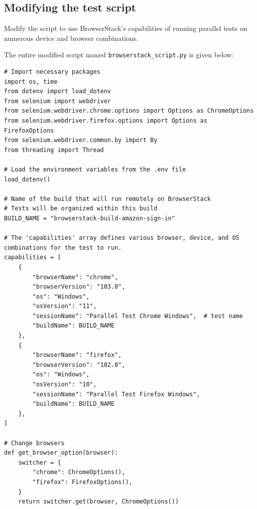 \documentclass{article}
\begin{document}
\subsection*{Modifying the test script}

Modify the script to use BrowserStack's capabilities of running parallel tests on numerous device and browser combinations.

The entire modified script named \texttt{browserstack\_script.py} is given below:

\begin{lstlisting}[style=python]
# Import necessary packages
import os, time
from dotenv import load_dotenv
from selenium import webdriver
from selenium.webdriver.chrome.options import Options as ChromeOptions
from selenium.webdriver.firefox.options import Options as FirefoxOptions
from selenium.webdriver.common.by import By
from threading import Thread

# Load the environment variables from the .env file
load_dotenv()

# Name of the build that will run remotely on BrowserStack
# Tests will be organized within this build
BUILD_NAME = "browserstack-build-amazon-sign-in"

# The 'capabilities' array defines various browser, device, and OS combinations for the test to run.
capabilities = [
    {
        "browserName": "chrome",
        "browserVersion": "103.0",
        "os": "Windows",
        "osVersion": "11",
        "sessionName": "Parallel Test Chrome Windows",  # test name
        "buildName": BUILD_NAME  
    },
    {
        "browserName": "firefox",
        "browserVersion": "102.0",
        "os": "Windows",
        "osVersion": "10",
        "sessionName": "Parallel Test Firefox Windows",
        "buildName": BUILD_NAME
    },
]

# Change browsers
def get_browser_option(browser):
    switcher = {
        "chrome": ChromeOptions(),
        "firefox": FirefoxOptions(),
    }
    return switcher.get(browser, ChromeOptions())


\end{lstlisting}
\end{document}
